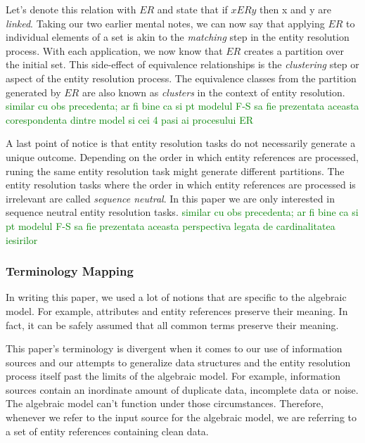 Let's denote this relation with $ER$ and state that if $xERy$ then x and y
are \textit{linked}\cite{Tal11}.
Taking our two earlier mental notes, we can now say that applying $ER$ to
individual elements of a set is akin to the \textit{matching} step in the
entity resolution process.
With each application, we now know that $ER$ creates a partition over the
initial set.
This side-effect of equivalence relationships is the \textit{clustering}
step or aspect of the entity resolution process.
The equivalence classes from the partition generated by $ER$ are also known
as \textit{clusters} in the context of entity resolution.
\textcolor{green}{similar cu obs precedenta; ar fi bine ca si pt modelul F-S sa fie prezentata aceasta corespondenta dintre model si cei 4 pasi ai procesului ER}

A last point of notice is that entity resolution tasks do not necessarily
generate a unique outcome\cite{Tal11}.
Depending on the order in which entity references are processed, runing the
same entity resolution task might generate different partitions.
The entity resolution tasks where the order in which entity references are
processed is irrelevant are called \textit{sequence neutral}\cite{Tal11}.
In this paper we are only interested in sequence neutral entity resolution
tasks.
\textcolor{green}{similar cu obs precedenta; ar fi bine ca si pt modelul F-S sa fie prezentata aceasta perspectiva legata de cardinalitatea iesirilor}

\subsubsection[algrel]{Terminology Mapping}\label{subsubsec:algrel}

In writing this paper, we used a lot of notions that are specific to the
algebraic model.
For example, attributes and entity references preserve their meaning.
In fact, it can be safely assumed that all common terms preserve their
meaning.

This paper's terminology is divergent when it comes to our use of
information sources and our attempts to generalize data structures and the
entity resolution process itself past the limits of the algebraic model.
For example, information sources contain an inordinate amount of duplicate
data, incomplete data or noise.
The algebraic model can't function under those circumstances.
Therefore, whenever we refer to the input source for the algebraic model,
we are referring to a set of entity references containing clean data.

